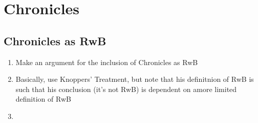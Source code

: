 \chapter{Chronicles}\label{chronicles}

\section{Chronicles as RwB}\label{chronicles-as-rwb}

\begin{enumerate}
\def\labelenumi{\arabic{enumi}.}
\tightlist
\item
  Make an argument for the inclusion of Chronicles as RwB
\item
  Basically, use Knoppers' Treatment, but note that his definitnion of
  RwB is such that his conclusion (it's not RwB) is dependent on amore
  limited definition of RwB
\item
  ​
\end{enumerate}
